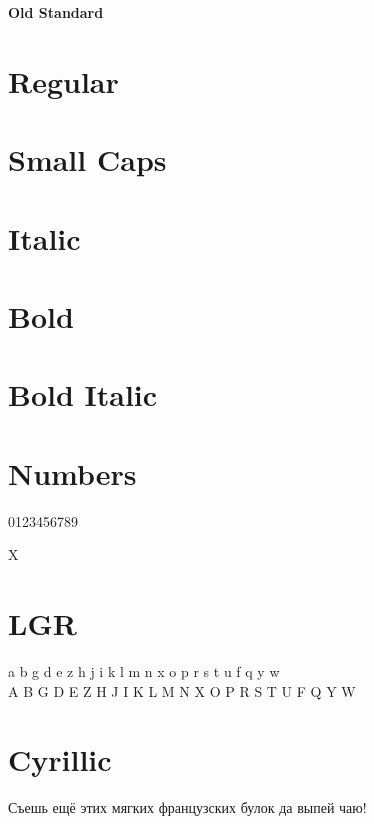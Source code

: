 \documentclass{article}
\begin{document}
\thispagestyle{empty}

\begin{center}\huge\bf Old Standard
\end{center}


\section*{Regular}
\lipsum[1]

\section*{Small Caps}
\textsc{\lipsum[1]}

\section*{Italic}
\textit{\lipsum[2]}

\section*{Bold}

\textbf{\lipsum[3]}

\section*{Bold Italic}


\textbf{\textit{\lipsum[4]}}

\section*{Numbers}

0123456789

\noindent
X

\section*{LGR}


{\oldstandardlgr\noindent
 a b g d e z h j i k l m n x o p r s t u f q y w\\
 A B G D E Z H J I K L M N X O P R S T U F Q Y W\\
}

\section*{Cyrillic}

{\ifxetex\else\ifluatex\else{}\selectfont\fi\fi

Съешь ещё этих мягких французских булок да
выпей чаю!}
\end{document}
